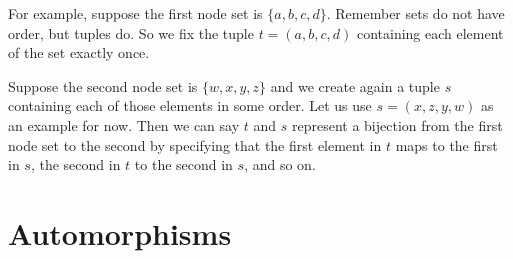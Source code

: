 \documentclass{iansnotes}
\begin{document}
  For example, suppose the first node set is $\{a, b, c, d\}$.
  Remember sets do not have order, but tuples do.
  So we fix the tuple $t = (a, b, c, d)$ containing each element of the set exactly once.
  
  Suppose the second node set is $\{w, x, y, z\}$ and we create again a tuple $s$ containing each of those elements in some order.
  Let us use $s = (x, z, y, w)$ as an example for now.
  Then we can say $t$ and $s$ represent a bijection from the first node set to the second by specifying that the first element in $t$ maps to the first in $s$, the second in $t$ to the second in $s$, and so on.
  

\section{Automorphisms}
\end{document}

